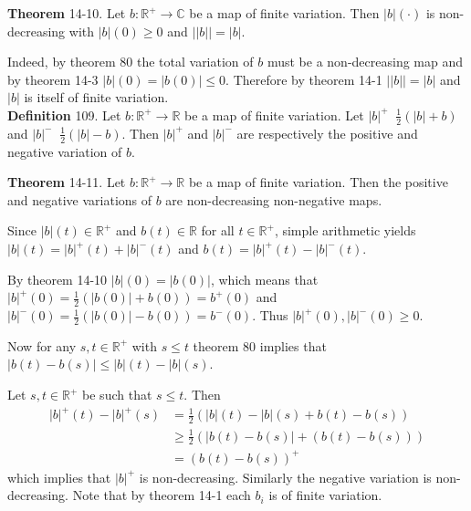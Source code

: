 \documentclass[a4paper]{article}
\newcommand{\brac}[1]{\left ( #1 \right )}
\newcommand{\abs}[1]{\left | #1 \right |}
\newcommand{\Real}{\mathbb{R}}
\newcommand{\Cplx}{\mathbb{C}}
\newcommand{\defn}{\mathop{\overset{\Delta}{=}}\nolimits}
\begin{document}
\label{thm:finte_var_prop}\noindent\textbf{Theorem} 14-10.
Let $b:\Real^+\to\Cplx$ be a map of finite variation. Then $\abs{b}\brac{\cdot}$ is non-decreasing with $\abs{b}\brac{0}\geq 0$ and $\abs{\abs{b}} = \abs{b}$.

Indeed, by theorem 80 the total variation of $b$ must be a non-decreasing map and by theorem 14-3 $\abs{b}\brac{0} = \abs{b\brac{0}}\leq 0$. Therefore by theorem 14-1 $\abs{\abs{b}} = \abs{b}$ and $\abs{b}$ is itself of finite variation.\\

\noindent\textbf{Definition} 109.
Let $b:\Real^+\to\Real$ be a map of finite variation. Let $\abs{b}^+\defn \frac{1}{2}\brac{\abs{b}+b}$ and $\abs{b}^-\defn \frac{1}{2}\brac{\abs{b}-b}$. Then $\abs{b}^+$ and $\abs{b}^-$ are respectively the positive and negative variation of $b$.

\label{thm:pos_neg_var_decomp}\noindent\textbf{Theorem} 14-11.
Let $b:\Real^+\to\Real$ be a map of finite variation. Then the positive and negative variations of $b$ are non-decreasing non-negative maps.

Since $\abs{b}\brac{t}\in \Real^+$ and $b\brac{t}\in \Real$ for all $t\in\Real^+$, simple arithmetic yields $\abs{b}\brac{t} = \abs{b}^+\brac{t}+\abs{b}^-\brac{t}$ and $b\brac{t}=\abs{b}^+\brac{t}-\abs{b}^-\brac{t}$.

By theorem 14-10 $\abs{b}\brac{0}=\abs{b\brac{0}}$, which means that $\abs{b}^+\brac{0} = \frac{1}{2}\brac{\abs{b\brac{0}}+b\brac{0}} = b^+\brac{0}$ and $\abs{b}^-\brac{0} = \frac{1}{2}\brac{\abs{b\brac{0}}-b\brac{0}} = b^-\brac{0}$. Thus $\abs{b}^+\brac{0},\abs{b}^-\brac{0}\geq 0$.

Now for any $s,t\in \Real^+$ with $s\leq t$ theorem 80 implies that $\abs{b\brac{t}-b\brac{s}}\leq \abs{b}\brac{t}-\abs{b}\brac{s}$.

Let $s,t\in \Real^+$ be such that $s\leq t$. Then \begin{align*}\abs{b}^+\brac{t}-\abs{b}^+\brac{s} &= \frac{1}{2}\brac{\abs{b}\brac{t}-\abs{b}\brac{s}+b\brac{t}-b\brac{s}}\\&\geq \frac{1}{2}\brac{\abs{b\brac{t}-b\brac{s}}+\brac{b\brac{t}-b\brac{s}}}\\&=\brac{b\brac{t}-b\brac{s}}^+\end{align*} which implies that $\abs{b}^+$ is non-decreasing. Similarly the negative variation is non-decreasing. Note that by theorem 14-1 each $b_i$ is of finite variation.\\
\end{document}
